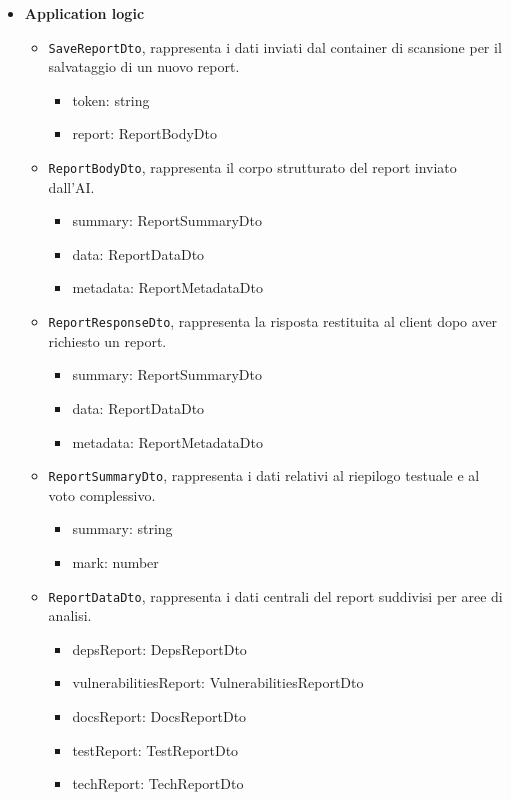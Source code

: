 \documentclass[a4paper, 11pt]{article}
\newcounter{subsubsubsection}[subsubsection]
\newcounter{subsubsubsubsection}[subsubsubsection]
\begin{document}
\begin{itemize}
  \item \textbf{Application logic}
    \begin{itemize}
      \item \texttt{SaveReportDto}, rappresenta i dati inviati dal container di scansione per il salvataggio di un nuovo report.
      \begin{itemize}
          \item token: string
          \item report: ReportBodyDto
      \end{itemize}

      \item \texttt{ReportBodyDto}, rappresenta il corpo strutturato del report inviato dall'AI.
      \begin{itemize}
          \item summary: ReportSummaryDto
          \item data: ReportDataDto
          \item metadata: ReportMetadataDto
      \end{itemize}

      \item \texttt{ReportResponseDto}, rappresenta la risposta restituita al client dopo aver richiesto un report.
      \begin{itemize}
          \item summary: ReportSummaryDto
          \item data: ReportDataDto
          \item metadata: ReportMetadataDto
      \end{itemize}

      \item \texttt{ReportSummaryDto}, rappresenta i dati relativi al riepilogo testuale e al voto complessivo.
      \begin{itemize}
          \item summary: string
          \item mark: number
      \end{itemize}

      \item \texttt{ReportDataDto}, rappresenta i dati centrali del report suddivisi per aree di analisi.
      \begin{itemize}
          \item depsReport: DepsReportDto
          \item vulnerabilitiesReport: VulnerabilitiesReportDto
          \item docsReport: DocsReportDto
          \item testReport: TestReportDto
          \item techReport: TechReportDto
      \end{itemize}


\end{itemize}
\end{itemize}
\end{document}
